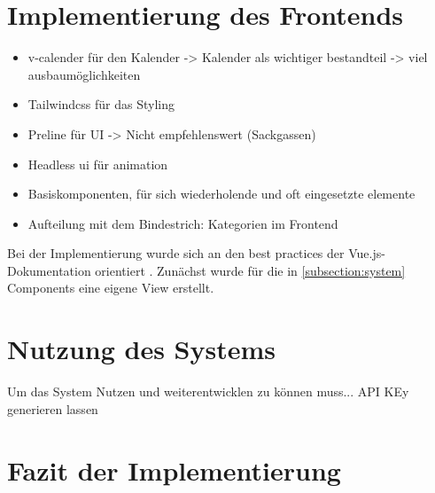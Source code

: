 \section{Implementierung des Frontends}
\begin{itemize}
  \item v-calender für den Kalender -> Kalender als wichtiger bestandteil -> viel ausbaumöglichkeiten
  \item Tailwindcss für das Styling
  \item Preline für UI -> Nicht empfehlenswert (Sackgassen)
  \item Headless ui für animation
  \item Basiskomponenten, für sich wiederholende und oft eingesetzte elemente
  \item Aufteilung mit dem Bindestrich: Kategorien im Frontend
\end{itemize}



Bei der Implementierung wurde sich an den best practices der
Vue.js-Dokumentation orientiert . Zunächst wurde für die
in \ref{subsection:system} Components eine eigene View erstellt.


\section{Nutzung des Systems}
Um das System Nutzen und weiterentwicklen zu können muss...
API KEy generieren lassen

\section{Fazit der Implementierung}